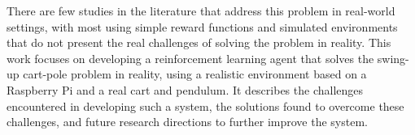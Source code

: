There are few studies in the literature that address this problem in real-world settings, with most using simple reward functions and simulated environments that do not present the real challenges of solving the problem in reality. This work focuses on developing a reinforcement learning agent that solves the swing-up cart-pole problem in reality, using a realistic environment based on a Raspberry Pi and a real cart and pendulum. It describes the challenges encountered in developing such a system, the solutions found to overcome these challenges, and future research directions to further improve the system.